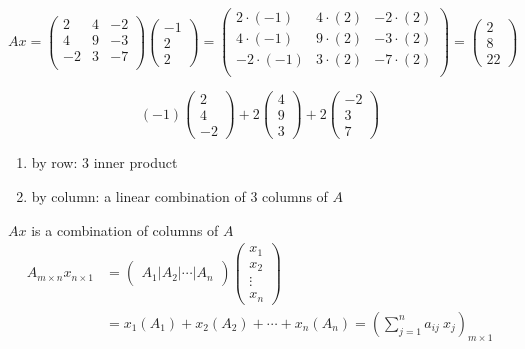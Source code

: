 \newpage

\begin{eg}
\[
Ax = \left(\begin{matrix}
2 & 4 & -2\\
4 & 9 & -3\\
-2 & 3 & -7\\
\end{matrix}\right)\left(\begin{matrix}
-1 \\ 2 \\ 2
\end{matrix}\right) = \left(\begin{matrix}
2\cdot(-1) & 4\cdot(2) & -2\cdot(2)\\
4\cdot(-1) & 9\cdot(2) & -3\cdot(2)\\
-2\cdot(-1) & 3\cdot(2) & -7\cdot(2)\\
\end{matrix}\right) = \left(\begin{matrix}
2 \\ 8 \\ 22
\end{matrix}\right)
\]    
\end{eg}

\[
(-1)\left(\begin{matrix}
2 \\4 \\-2
\end{matrix}\right) + 
2\left(\begin{matrix}
4 \\9 \\3
\end{matrix}\right) +
2\left(\begin{matrix}
-2 \\3 \\7
\end{matrix}\right)
\]

\begin{enumerate}[label=(\arabic*)]
    \item by row: 3 inner product
    \item by column: a linear combination of 3 columns of $A$
\end{enumerate}

\begin{eg}[1A]
    \(Ax\) is a combination of columns of $A$
\begin{align*}
A_{m\times n} x_{n\times 1} &= 
\left(\begin{matrix}
A_1 | A_2|\cdots|A_n
\end{matrix}\right)\left(\begin{matrix}
x_1 \\ x_2 \\ \vdots \\ x_n
\end{matrix}\right) \\
&= x_1(A_1) + x_2(A_2) + \cdots + x_n(A_n) = \left(\sum_{j=1}^{n} a_{ij}\ x_{j}\right)_{m\times1}
\end{align*}
\end{eg}

